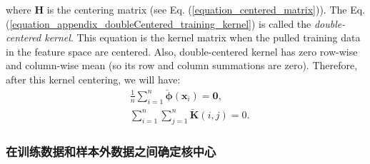 \documentclass[lang=cn,10pt]{gorgeousnbook}
\numberwithin{equation}{section}%
\numberwithin{figure}{section}%
\begin{document}
where $\boldsymbol{H}$ is the centering matrix (see Eq. (\ref{equation_centered_matrix})).
The Eq. (\ref{equation_appendix_doubleCentered_training_kernel}) is called the \textit{double-centered kernel}. 
This equation is the kernel matrix when the pulled training data in the feature space are centered. Also, double-centered kernel has zero row-wise and column-wise mean (so its row and column summations are zero). 
Therefore, after this kernel centering, we will have:
\begin{align}
&\frac{1}{n} \sum_{i=1}^n \breve{\boldsymbol{\phi}}(\boldsymbol{x}_i) = \boldsymbol{0}, \\
&\sum_{i=1}^n \sum_{j=1}^n \breve{\boldsymbol{K}}(i,j) = 0. \label{equation_appendix_doubleCentered_training_kernel_sum}
\end{align}

\subsubsection{在训练数据和样本外数据之间确定核中心}
\end{document}

